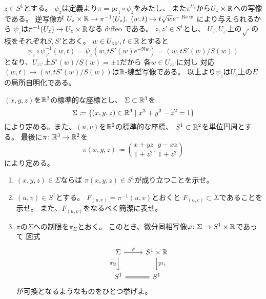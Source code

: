 \documentclass[report]{jlreq}
\begin{document}
\begin{answer}
    $z \in S^1$とする。
    $\psi_z$は定義より$\pi = \mathrm{pr}_1 \circ \psi_z$をみたし、
    また$\pi^{U_z}$から$U_z \times \mathbb{R}$への{\smooth}写像である。
    {\smooth}逆写像が
    $U_z \times \mathbb{R} \to \pi^{-1}(U_z), \; (w, t) \mapsto t\sqrt{w} e^{-\operatorname{\mathrm{Re}} w}$
    により与えられるから
    $\psi_z$は$\pi^{-1}(U_z) \to U_z \times \mathbb{R}$なる diffeo である。
    $z, z' \in S^1$とし、
    $U_z, U_{z'}$上の$\sqrt{\cdot}$の枝をそれぞれ$S, S'$とおく。
    $w \in U_{zz'}, t \in \mathbb{R}$とすると
    \begin{equation}
        \psi_z \circ \psi_{z'}^{-1} (w, t)
            = \psi_z (w, t S'(w) e^{-\Re w})
            = (w, t S'(w) / S(w))
    \end{equation}
    となり、$U_{zz'}$上$S'(w) / S(w) = \pm 1$だから
    各$w \in U_{zz'}$に対し
    対応$(w, t) \mapsto (w, t S'(w) / S(w))$は$\mathbb{R}$-線型写像である。
    以上より$\psi_z$は$U_z$上の$E$の局所自明化である。
\end{answer}

\begin{problem}
    $(x, y, z)$を$\mathbb{R}^3$の標準的な座標とし、
    $\Sigma \subset \mathbb{R}^3$を
    \begin{equation}
        \Sigma \coloneqq \{
            (x, y, z) \in \mathbb{R}^3
            \mid
            x^2 + y^2 - z^2 = 1
        \}
    \end{equation}
    により定める。また、$(u, v)$を$\mathbb{R}^2$の標準的な座標、
    $S^1 \subset \mathbb{R}^2$を単位円周とする。
    最後に$\pi \colon \mathbb{R}^3 \to \mathbb{R}^2$を
    \begin{equation}
        \pi(x, y, z) \coloneqq \left(
            \frac{x + yz}{1 + z^2},
            \frac{y - xz}{1 + z^2}
        \right)
    \end{equation}
    により定める。
    \begin{enumerate}
        \item $(x, y, z) \in \Sigma$ならば
            $\pi(x, y, z) \in S^1$が成り立つことを示せ。
        \item $(u, v) \in S^1$とする。
            $F_{(u, v)} = \pi^{-1}(u, v)$とおくと
            $F_{(u, v)} \subset \Sigma$であることを示せ。
            また、$F_{(u, v)}$をなるべく簡潔に表せ。
        \item $\pi$の$\Sigma$への制限を$\pi_\Sigma$とおく。
            このとき、微分同相写像$\varphi \colon \Sigma \to S^1 \times \mathbb{R}$であって
            図式
            \begin{equation}
                \begin{tikzcd}
                    \Sigma
                        \ar{r}{\varphi}
                        \ar{d}[swap]{\pi_\Sigma}
                        & S^1 \times \R
                            \ar{d}{\mathrm{pr}_1} \\
                    S^1
                        \ar[equal]{r}
                        & S^1
                \end{tikzcd}
            \end{equation}
            が可換となるようなものをひとつ挙げよ。
    \end{enumerate}
\end{problem}
\end{document}
